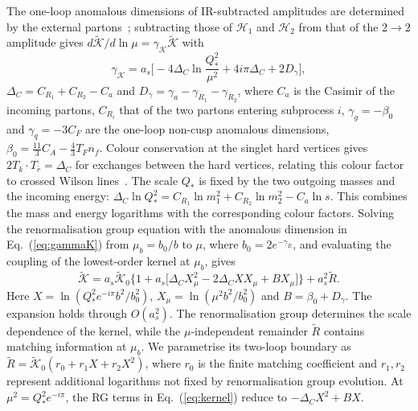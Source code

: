 \documentclass[%
 twocolumn,
 superscriptaddress,
 preprintnumbers,
 nofootinbib,
 amsmath,amssymb,
 aps,
 prl,
]{revtex4-2}
\newcommand{\DD}{\Delta_C}
\newcommand{\DG}{D_\gamma}
\newcommand{\Kt}{\widetilde{\mathcal K}}
\begin{document}
The one-loop anomalous dimensions of IR-subtracted amplitudes are determined by the
external partons~\cite{Becher:2009cu}; subtracting those of $\mathcal H_1$ and $\mathcal H_2$ from
that of the $2\to2$ amplitude gives $d\Kt/d\ln\mu=\gamma_{\mathcal K}\Kt$ with
\begin{equation}
\gamma_{\mathcal K}=a_s\Big[-4\DD\ln\frac{Q_*^2}{\mu^2}+4i\pi\DD+2\DG\Big],
\label{eq:gammaK}
\end{equation}
$\DD=C_{R_1}+C_{R_2}-C_a$ and $\DG=\gamma_a-\gamma_{R_1}-\gamma_{R_2}$, where $C_a$ is the Casimir
of the incoming partons, $C_{R_i}$ that of the two partons entering subprocess $i$,
$\gamma_g=-\beta_0$ and $\gamma_q=-3C_F$ are the one-loop non-cusp anomalous dimensions,
$\beta_0=\frac{11}3C_A-\frac43T_Fn_f$.
Colour conservation at the singlet hard vertices gives
$2T_k\cdot T_{\bar r}=\DD$ for exchanges between the
hard vertices, relating this colour factor to
crossed Wilson lines~\cite{Korchemskaya:1994qp}.
The scale $Q_*$ is fixed by
the two outgoing masses and the incoming energy:
$\DD\ln Q_*^2=C_{R_1}\ln m_1^2+C_{R_2}\ln m_2^2-C_a\ln s$.
This combines the mass and energy logarithms
with the corresponding colour factors.
Solving the renormalisation group equation with the
anomalous dimension in Eq.~(\ref{eq:gammaK}) from
$\mu_b=b_0/b$ to $\mu$, where $b_0=2e^{-\gamma_E}$,
and evaluating the coupling of the lowest-order kernel
at $\mu_b$, gives
\begin{equation}
\Kt=a_s\Kt_0\big\{1+a_s\big[\DD X_\mu^2-2\DD XX_\mu+BX_\mu\big]\big\}+a_s^2\widetilde R.
\label{eq:kernel}
\end{equation}
Here $X=\ln(Q_*^2e^{-i\pi}b^2/b_0^2)$,
$X_\mu=\ln(\mu^2b^2/b_0^2)$ and $B=\beta_0+\DG$. The expansion holds through $O(a_s^2)$. The renormalisation group determines the scale
dependence of the kernel, while the $\mu$-independent remainder
$\widetilde R$ contains matching information at $\mu_b$.
We parametrise its two-loop boundary as \(\widetilde R=\widetilde{\mathcal K}_0(r_0+r_1X+r_2X^2)\), where \(r_0\) is the finite matching coefficient and \(r_1,r_2\) represent additional logarithms not fixed by renormalisation group evolution.
At $\mu^2=Q_*^2e^{-i\pi}$, the RG terms
in Eq.~(\ref{eq:kernel}) reduce to
$-\Delta_C X^2+BX$.
\end{document}
